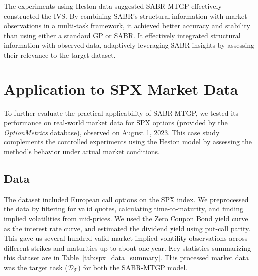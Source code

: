 \documentclass[preprint,12pt]{elsarticle}
\begin{document}
The experiments using Heston data suggested SABR-MTGP effectively constructed the IVS. By combining SABR's structural information with market observations in a multi-task framework, it achieved better accuracy and stability than using either a standard GP or SABR. It effectively integrated structural information with observed data, adaptively leveraging SABR insights by assessing their relevance to the target dataset.

\section{Application to SPX Market Data} \label{sec:spx_application}

To further evaluate the practical applicability of SABR-MTGP, we tested its performance on real-world market data for SPX options (provided by the \textit{OptionMetrics} database), observed on August 1, 2023. This case study complements the controlled experiments using the Heston model by assessing the method's behavior under actual market conditions.

\subsection{Data}

The dataset included European call options on the SPX index. We preprocessed the data by filtering for valid quotes, calculating time-to-maturity, and finding implied volatilities from mid-prices. We used the Zero Coupon Bond yield curve as the interest rate curve, and estimated the dividend yield using put-call parity. This gave us several hundred valid market implied volatility observations across different strikes and maturities up to about one year. Key statistics summarizing this dataset are in Table~\ref{tab:spx_data_summary}. This processed market data was the target task ($\mathcal{D}_\mathcal{T}$) for both the SABR-MTGP model.
\end{document}
